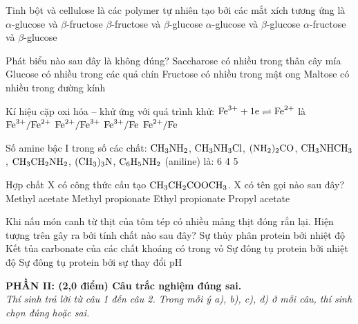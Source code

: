 \documentclass[11pt,a4paper]{article}
\begin{document}
\begin{ex}
Tinh bột và cellulose là các polymer tự nhiên tạo bởi các mắt xích tương ứng là
\choice
{$\alpha$-glucose và $\beta$-fructose}
{$\beta$-fructose và $\beta$-glucose}
{\True $\alpha$-glucose và $\beta$-glucose}
{$\alpha$-fructose và $\beta$-glucose}
\end{ex}
\begin{ex}
Phát biểu nào sau đây là không đúng?
\choice
{Saccharose có nhiều trong thân cây mía}
{Glucose có nhiều trong các quả chín}
{Fructose có nhiều trong mật ong}
{\True Maltose có nhiều trong đường kính}
\end{ex}
\begin{ex}
Kí hiệu cặp oxi hóa -- khử ứng với quá trình khử: $\ce{Fe^3+} + 1\ce{e} \rightleftharpoons \ce{Fe^2+}$ là
\choice
{\True $\ce{Fe^3+}/\ce{Fe^2+}$}
{$\ce{Fe^2+}/\ce{Fe^3+}$}
{$\ce{Fe^3+}/\ce{Fe}$}
{$\ce{Fe^2+}/\ce{Fe}$}
\end{ex}
\begin{ex}
Số amine bậc I trong số các chất: $\ce{CH3NH2}$, $\ce{CH3NH3Cl}$, $\ce{(NH2)2CO}$, $\ce{CH3NHCH3}$, $\ce{CH3CH2NH2}$, $\ce{(CH3)3N}$, $\ce{C6H5NH2}$ (aniline) là:
\choice
{6}
{}
{4}
{5}
\end{ex}
\begin{ex}
Hợp chất X có công thức cấu tạo $\ce{CH3CH2COOCH3}$. X có tên gọi nào sau đây?
\choice
{Methyl acetate}
{\True Methyl propionate}
{Ethyl propionate}
{Propyl acetate}
\end{ex}
\begin{ex}
Khi nấu món canh từ thịt của tôm tép có nhiều mảng thịt đóng rắn lại. Hiện tượng trên gây ra bởi tính chất nào sau đây?
\choice
{Sự thủy phân protein bởi nhiệt độ}
{Kết tủa carbonate của các chất khoáng có trong vỏ}
{\True Sự đông tụ protein bởi nhiệt độ}
{Sự đông tụ protein bởi sự thay đổi pH}
\end{ex}
\vspace{4pt}
\noindent
{\color{mainGreen}\textbf{\large PHẦN II: (2,0 điểm) Câu trắc nghiệm đúng sai.}}\\
\textit{\small Thí sinh trả lời từ câu 1 đến câu 2. Trong mỗi ý a), b), c), d) ở mỗi câu, thí sinh chọn đúng hoặc sai.}
\vspace{2pt}
\end{document}
